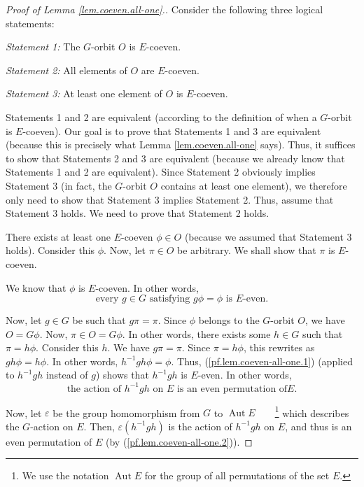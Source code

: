 \documentclass[12pt]{article}
\theoremstyle{plain}
\theoremstyle{definition}
\theoremstyle{remark}
\begin{document}
\begin{proof}
[Proof of Lemma \ref{lem.coeven.all-one}.] Consider the following three
logical statements:

\textit{Statement 1:} The $G$-orbit $O$ is $E$-coeven.

\textit{Statement 2:} All elements of $O$ are $E$-coeven.

\textit{Statement 3:} At least one element of $O$ is $E$-coeven.

Statements 1 and 2 are equivalent (according to the definition of
when a $G$-orbit is $E$-coeven).
Our goal is to prove that Statements 1 and 3 are
equivalent (because this is precisely what Lemma \ref{lem.coeven.all-one}
says). Thus, it suffices to show that Statements 2 and 3 are
equivalent (because we already know that Statements 1 and 2 are
equivalent). Since Statement 2 obviously implies Statement 3 (in fact,
the $G$-orbit $O$ contains at least one element), we therefore only
need to show that Statement 3 implies Statement 2. Thus, assume that Statement
3 holds. We need to prove that Statement 2 holds.

There exists at least one $E$-coeven $\phi\in O$ (because we assumed that
Statement 3 holds). Consider this $\phi$. Now, let $\pi\in O$ be arbitrary. We
shall show that $\pi$ is $E$-coeven.

We know that $\phi$ is $E$-coeven. In other words,
\begin{equation}
\text{every }g\in G\text{ satisfying }g\phi=\phi\text{ is }E\text{-even.}%
\label{pf.lem.coeven-all-one.1}%
\end{equation}


Now, let $g\in G$ be such that $g\pi=\pi$. Since $\phi$ belongs to the
$G$-orbit $O$, we have $O=G\phi$. Now, $\pi\in O=G\phi$. In other words, there
exists some $h\in G$ such that $\pi=h\phi$. Consider this $h$. We have
$g\pi=\pi$. Since $\pi=h\phi$, this rewrites as $gh\phi=h\phi$. In other
words, $h^{-1}gh\phi=\phi$. Thus, (\ref{pf.lem.coeven-all-one.1}) (applied to
$h^{-1}gh$ instead of $g$) shows that $h^{-1}gh$ is $E$-even. In other words,%
\begin{equation}
\text{the action of }h^{-1}gh\text{ on }E\text{ is an even permutation of
}E\text{.}\label{pf.lem.coeven-all-one.2}%
\end{equation}


Now, let $\varepsilon$ be the group homomorphism from $G$ to
$\operatorname{Aut}E$\ \ \ \ \footnote{We use the notation
$\operatorname{Aut}E$ for the group of all permutations
of the set $E$.} which describes the $G$-action on $E$. Then,
$\varepsilon\left(  h^{-1}gh\right)  $ is the action of $h^{-1}gh$ on $E$, and
thus is an even permutation of $E$ (by (\ref{pf.lem.coeven-all-one.2})).


\end{proof}
\end{document}
